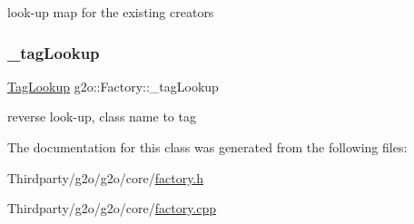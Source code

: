 look-\/up map for the existing creators 

\mbox{\label{classg2o_1_1_factory_a93fbd79ea000ed88101c1f23b19e6e2a}} 
\subsubsection{\texorpdfstring{\+\_\+tag\+Lookup}{\_tagLookup}}
{\footnotesize\ttfamily \mbox{\hyperlink{classg2o_1_1_factory_aba274179c053b3b71dcef6a20c898496}{Tag\+Lookup}} g2o\+::\+Factory\+::\+\_\+tag\+Lookup\hspace{0.3cm}{\ttfamily [protected]}}



reverse look-\/up, class name to tag 



The documentation for this class was generated from the following files\+:\begin{DoxyCompactItemize}
\item 
Thirdparty/g2o/g2o/core/\mbox{\hyperlink{factory_8h}{factory.\+h}}\item 
Thirdparty/g2o/g2o/core/\mbox{\hyperlink{factory_8cpp}{factory.\+cpp}}\end{DoxyCompactItemize}
